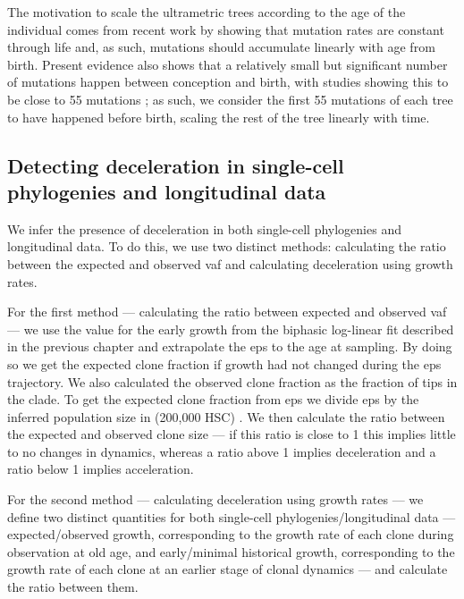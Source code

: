 The motivation to scale the ultrametric trees according to the age of the individual comes from recent work by  showing that mutation rates are constant through life \cite{Abascal_2021_gjvqfm} and, as such, mutations should accumulate linearly with age from birth. Present evidence also shows that a relatively small but significant number of mutations happen between conception and birth, with studies showing this to be close to 55 mutations \cite{SpencerChapman_2021_gjz4x4,Mitchell2021-zl}; as such, we consider the first 55 mutations of each tree to have happened before birth, scaling the rest of the tree linearly with time.

\subsection{Detecting deceleration in single-cell phylogenies and longitudinal data}

We infer the presence of deceleration in both single-cell phylogenies and longitudinal data. To do this, we use two distinct methods: calculating the ratio between the expected and observed \ac{vaf} and calculating deceleration using growth rates. 

For the first method --- calculating the ratio between expected and observed \ac{vaf} --- we use the value for the early growth from the biphasic log-linear fit described in the previous chapter and extrapolate the \ac{eps} to the age at sampling. By doing so we get the expected clone fraction if growth had not changed during the \ac{eps} trajectory. We also calculated the observed clone fraction as the fraction of tips in the clade. To get the expected clone fraction from \ac{eps} we divide \ac{eps} by the inferred population size in  (200,000 HSC) \cite{Lee-Six2018-lp}. We then calculate the ratio between the expected and observed clone size --- if this ratio is close to 1 this implies little to no changes in dynamics, whereas a ratio above 1 implies deceleration and a ratio below 1 implies acceleration.

For the second method --- calculating deceleration using growth rates --- we define two distinct quantities for both single-cell phylogenies/longitudinal data --- expected/observed growth, corresponding to the growth rate of each clone during observation at old age, and early/minimal historical growth, corresponding to the growth rate of each clone at an earlier stage of clonal dynamics --- and calculate the ratio between them.

